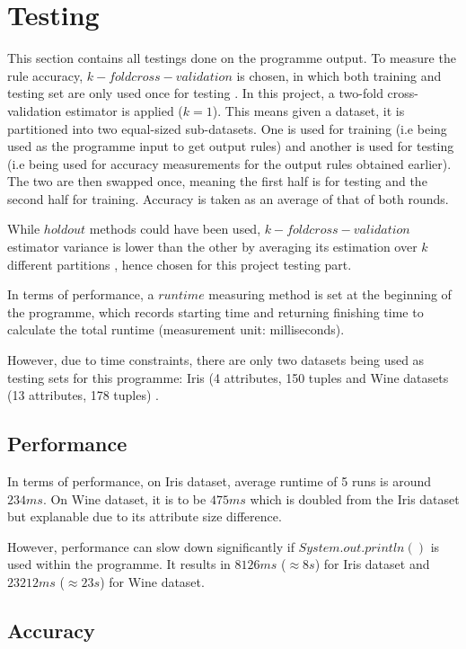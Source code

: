 \chapter{Testing}

This section contains all testings done on the programme output. To measure the rule accuracy, $k-fold cross-validation$ is chosen, in which both training and testing set are only used once for testing \cite{Kohavi95astudy}. In this project, a two-fold cross-validation estimator is applied ($k=1$). This means given a dataset, it is partitioned into two equal-sized sub-datasets. One is used for training (i.e being used as the programme input to get output rules) and another is used for testing (i.e being used for accuracy measurements for the output rules obtained earlier). The two are then swapped once, meaning the first half is for testing and the second half for training. Accuracy is taken as an average of that of both rounds.

While $holdout$ methods could have been used, $k-fold cross-validation$ estimator variance is lower than the other by averaging its estimation over $k$ different partitions \cite{Kohavi95astudy}, hence chosen for this project testing part.

In terms of performance, a $runtime$ measuring method is set at the beginning of the programme, which records starting time and returning finishing time to calculate the total runtime (measurement unit: milliseconds).

However, due to time constraints, there are only two datasets being used as testing sets for this programme: Iris (4 attributes, 150 tuples and Wine datasets (13 attributes, 178 tuples) \cite{ucirepo}.


\section{Performance}

In terms of performance, on Iris dataset, average runtime of 5 runs is around $234ms$. On Wine dataset, it is to be $475ms$ which is doubled from the Iris dataset but explanable due to its attribute size difference.

However, performance can slow down significantly if $System.out.println()$ is used within the programme. It results in $8126ms$ ($\approx 8s$) for Iris dataset and $23212ms$ ($\approx 23s$) for Wine dataset.  

\section{Accuracy}


